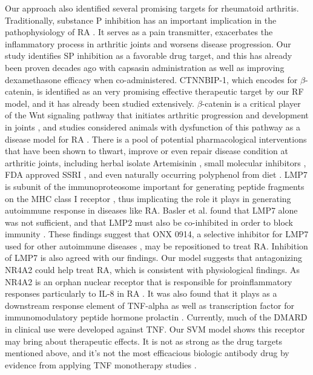     Our approach also identified several promising targets for rheumatoid arthritis. Traditionally, substance P inhibition has an important implication in the pathophysiology of RA \cite{lisowska2015substance,garrett1992role,green2005gastrin,keeble2004role,lotz1987substance,okamura2017dual,lam1990mediators,lam1991neurogenic}. It serves as a pain transmitter, exacerbates the inflammatory process in arthritic joints and worsens disease progression. Our study identifies SP inhibition as a favorable drug target, and this has already been proven decades ago with capsasin administration \cite{lam1989capsaicin} as well as improving dexamethasone \cite{lam2010substance} efficacy when co-administered. CTNNBIP-1, which encodes for $\beta$-catenin, is identified as an very promising effective therapeutic target by our RF model, and it has already been studied extensively. $\beta$-catenin is a critical player of the Wnt signaling pathway that initiates arthritic progression and development in joints \cite{sen2005wnt,zhou2017wnt}, and studies considered animals with dysfunction of this pathway as a disease model for RA \cite{wu2010beta,zhou2017wnt}. There is a pool of potential pharmacological interventions that have been shown to thwart, improve or even repair disease condition at arthritic joints, including herbal isolate Artemisinin \cite{zhong2018artemisinin}, small molecular inhibitors \cite{lietman2018inhibition,landman2013small,landman2013small,dell2017pharmacological}, FDA approved SSRI \cite{miyamoto2017fluoxetine}, and even naturally occurring polyphenol from diet \cite{li2018resveratrol}. LMP7 is subunit of the immunoproteosome important for generating peptide fragments on the MHC class I receptor \cite{joeris2012proteasome}, thus implicating the role it plays in generating autoimmune response in diseases like RA. Basler et al. found that LMP7 alone was not sufficient, and that LMP2 must also be co-inhibited in order to block immunity \cite{basler2018co}. These findings suggest that ONX 0914, a selective inhibitor for LMP7 used for other autoimmune diseases \cite{althof2018immunoproteasome,liu2017onx,verbrugge2012targeting}, may be repositioned to treat RA. Inhibition of LMP7 is also agreed with our findings. Our model suggests that antagonizing NR4A2 could help treat RA, which is consistent with physiological findings. As NR4A2 is an orphan nuclear receptor that is responsible for proinflammatory responses particularly to IL-8 in RA \cite{aherne2009identification}. It was also found that it plays as a downstream response element of TNF-alpha \cite{mix2012orphan} as well as transcription factor for immunomodulatory peptide hormone prolactin \cite{mccoy2015orphan}. Currently, much of the DMARD in clinical use were developed against TNF. Our SVM model shows this receptor may bring about therapeutic effects. It is not as strong as the drug targets mentioned above, and it's not the most efficacious biologic antibody drug by evidence from applying TNF monotherapy studies\cite{aletaha2018diagnosis} .
  
